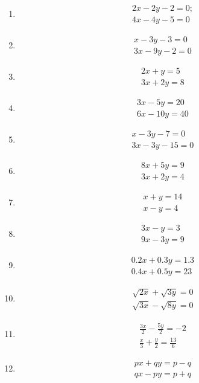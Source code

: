 \begin{enumerate}[label=\thesubsection.\arabic*,ref=\thesubsection.\theenumi]
\item \begin{align}
	2x-2y-2=0;\\
	4x-4y-5=0
	\end{align}
	\item \begin{align}
	x-3y-3=0\\
	3x-9y-2=0
        \end{align}
       \item \begin{align}
	2x+y=5\\
	3x+2y=8
	\end{align}
	\item \begin{align}
	3x-5y=20\\
	6x-10y=40
	\end{align}
	\item \begin{align}
	x-3y-7=0\\
	3x-3y-15=0
        \end{align}
\item \begin{align}
8x+5y=9
\\ 3x+2y=4
\end{align}
	\item
	\begin{align}
   	 x+y=14 \\x-y=4
	\end{align}
	\item
	\begin{align}
    	3x-y=3\\ 9x-3y=9
	\end{align}
\item 	\begin{align}   	
 	0.2x+0.3y=1.3\\ 0.4x+0.5y=23
	\end{align}
	\item     
	\begin{align}
	\sqrt{2x}+\sqrt{3y}=0\\ \sqrt{3x}-\sqrt{8y}=0
	\end{align}
	\item
	\begin{align}
    	\frac{3x}{2}-\frac{5y}{2}=-2\\ \frac{x}{3}+\frac{y}{2}=\frac{13}{6}
    	\end{align}
\item
\begin{align}
px+qy=p-q\\ qx-py=p+q

\end{align}
\end{enumerate}
